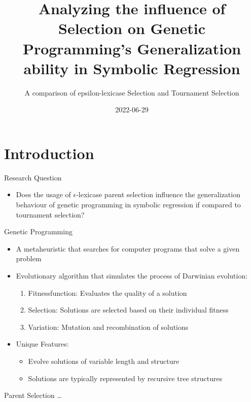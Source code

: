 \documentclass[
  ignorenonframetext,
]{beamer}
\title{Analyzing the influence of Selection on Genetic Programming's
Generalization ability in Symbolic Regression}
\subtitle{A comparison of epsilon-lexicase Selection and Tournament
Selection}
\author{}
\date{\vspace{-2.5em}2022-06-29}
\providecommand{\tightlist}{%
  \setlength{\itemsep}{0pt}\setlength{\parskip}{0pt}}
\begin{document}
\frame{\titlepage}

\begin{frame}[allowframebreaks]
  \tableofcontents[hideallsubsections]
\end{frame}
\hypertarget{introduction}{%
\section{Introduction}\label{introduction}}

\begin{frame}{Research Question}
\protect\hypertarget{research-question}{}
\begin{itemize}
\tightlist
\item
  Does the usage of \(\epsilon\)-lexicase parent selection influence the
  generalization behaviour of genetic programming in symbolic regression
  if compared to tournament selection?
\end{itemize}
\end{frame}

\begin{frame}{Genetic Programming}
\protect\hypertarget{genetic-programming}{}
\begin{itemize}
\tightlist
\item
  A metaheuristic that searches for computer programs that solve a given
  problem
\item
  Evolutionary algorithm that simulates the process of Darwinian
  evolution:

  \begin{enumerate}
  \tightlist
  \item
    Fitnessfunction: Evaluates the quality of a solution
  \item
    Selection: Solutions are selected based on their individual fitness
  \item
    Variation: Mutation and recombination of solutions
  \end{enumerate}
\item
  Unique Features:

  \begin{itemize}
  \tightlist
  \item
    Evolve solutions of variable length and structure
  \item
    Solutions are typically represented by recursive tree structures
  \end{itemize}
\end{itemize}
\end{frame}

\begin{frame}{Parent Selection}
\protect\hypertarget{parent-selection}{}
\ldots{}
\end{frame}
\end{document}
